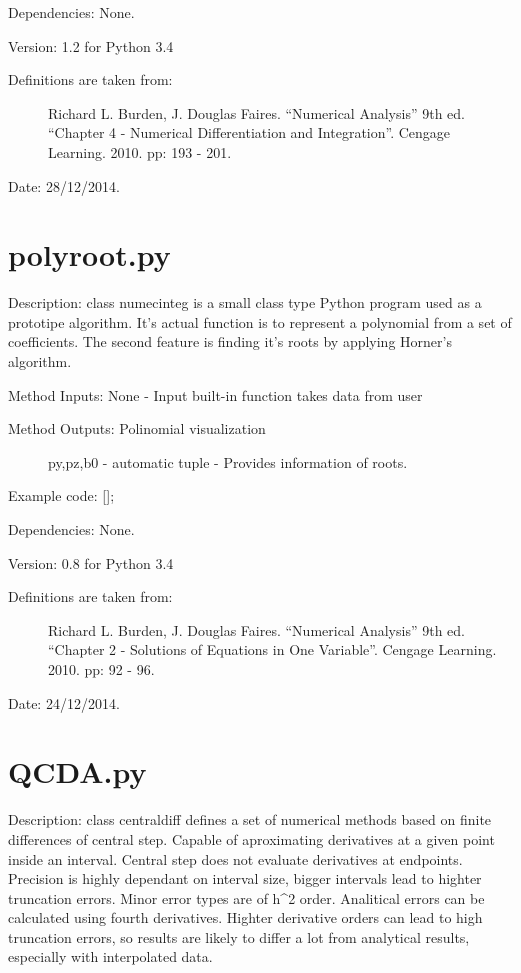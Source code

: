 \documentclass[letterpaper,10pt,oneside]{sphinxmanual}
\theoremstyle{plain}%
\theoremstyle{definition}%
\theoremstyle{remark}%
\begin{document}
Dependencies: None.

Version: 1.2 for Python 3.4
\begin{description}
\item[{Definitions are taken from:}] \leavevmode
Richard L. Burden, J. Douglas Faires. ``Numerical Analysis'' 9th ed.
``Chapter 4 - Numerical Differentiation and Integration''. 
Cengage Learning. 2010. pp: 193 - 201.

\end{description}




Date: 28/12/2014.


\section{polyroot.py}
\label{code:polyroot-py}\label{code:module-polyroot}
Description: class numecinteg is a small class type Python program used as 
a prototipe algorithm. It's actual function is to represent a polynomial from
a set of coefficients. The second feature is finding it's roots by applying
Horner's algorithm.

Method Inputs: None - Input built-in function takes data from user
\begin{description}
\item[{Method Outputs: Polinomial visualization}] \leavevmode
py,pz,b0 - automatic tuple - Provides information of roots.

\end{description}

Example code: {[}{]};

Dependencies: None.

Version: 0.8 for Python 3.4
\begin{description}
\item[{Definitions are taken from:}] \leavevmode
Richard L. Burden, J. Douglas Faires. ``Numerical Analysis'' 9th ed.
``Chapter 2 - Solutions of Equations in One Variable''. 
Cengage Learning. 2010. pp: 92 - 96.

\end{description}




Date: 24/12/2014.


\section{QCDA.py}
\label{code:module-QCDA}\label{code:qcda-py}
Description: class centraldiff defines a set of numerical methods based on
finite differences of central step. Capable of aproximating derivatives at
a given point inside an interval. Central step does not evaluate derivatives
at endpoints. Precision is highly dependant on interval size, bigger intervals
lead to highter truncation errors. Minor error types are of h\textasciicircum{}2 order.
Analitical errors can be calculated using fourth derivatives. Highter
derivative orders can lead to high truncation errors, so results are likely
to differ a lot from analytical results, especially with interpolated data.
\end{document}
